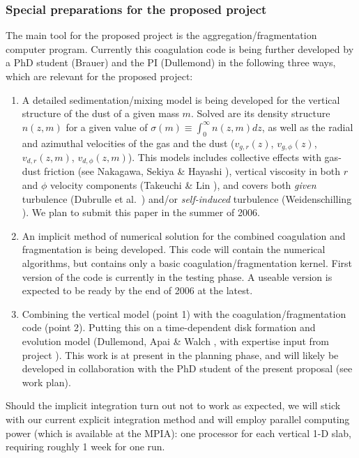 \subsubsection{Special preparations for the proposed project}\label{sec-special-prep}
The main tool for the proposed project is the aggregation/fragmentation
computer program. Currently this coagulation code is being further developed
by a PhD student (Brauer) and the PI (Dullemond) in the following three
ways, which are relevant for the proposed project:
\begin{enumerate}
\item A detailed sedimentation/mixing model is being developed for the
vertical structure of the dust of a given mass $m$. Solved are its density
structure $n(z,m)$ for a given value of $\sigma(m)\equiv \int_0^\infty
n(z,m)dz$, as well as the radial and azimuthal velocities of the gas and the
dust ($v_{g,r}(z)$, $v_{g,\phi}(z)$, $v_{d,r}(z,m)$,
$v_{d,\phi}(z,m)$). This models includes collective effects with gas-dust
friction (see Nakagawa, Sekiya \& Hayashi ), vertical viscosity in
both $r$ and $\phi$ velocity components (Takeuchi \& Lin ), and
covers both {\em given} turbulence (Dubrulle et al.~) and/or {\em
self-induced} turbulence (Weidenschilling ). We plan to submit
this paper in the summer of 2006.
\item An implicit method of numerical solution for the combined coagulation
and fragmentation is being developed. This code will contain the numerical
algorithms, but contains only a basic coagulation/fragmentation kernel.
First version of the code is currently in the testing phase. A useable
version is expected to be ready by the end of 2006 at the latest.
\item Combining the vertical model (point 1) with the
coagulation/fragmentation code (point 2). Putting this on a time-dependent
disk formation and evolution model (Dullemond, Apai \& Walch , with
expertise input from project \projtscharn{}). 
This work is at present in the planning phase, and will likely be developed
in collaboration with the PhD student of the present proposal (see work
plan).
\end{enumerate}
Should the implicit integration turn out not to work as expected, we will
stick with our current explicit integration method and will employ parallel
computing power (which is available at the MPIA): one processor for each
vertical 1-D slab, requiring roughly 1 week for one run.

